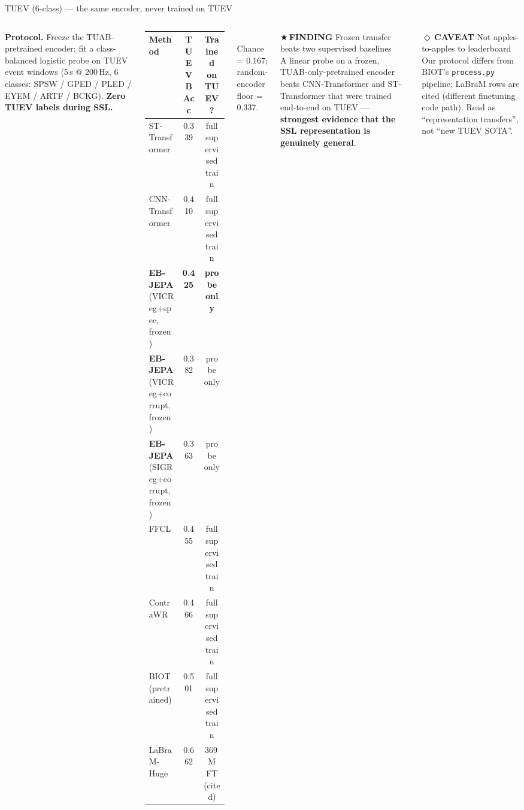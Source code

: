 \documentclass[aspectratio=169,11pt]{beamer}
\newcommand{\caveattag}{\textcolor{tplred}{\scriptsize\sffamily\bfseries$\Diamond$\,CAVEAT}\xspace}
\newcommand{\findingtag}{\textcolor{tplgold}{\scriptsize\sffamily\bfseries$\bigstar$\,FINDING}\xspace}
\newcommand{\sectionheader}[1]{\renewcommand{\insertsection}{#1}}
\begin{document}
\sectionheader{TUEV \,\textperiodcentered\, FROZEN CROSS-TASK TRANSFER}
\begin{frame}{TUEV (6-class) --- the same encoder, never trained on TUEV}
\begin{columns}[T,onlytextwidth]
\textbf{Protocol.} Freeze the TUAB-pretrained encoder; fit a class-balanced
logistic probe on TUEV event windows (5\,s @ 200\,Hz, 6 classes:
SPSW / GPED / PLED / EYEM / ARTF / BCKG).
\textbf{Zero TUEV labels during SSL.}

\vspace{0.3em}
\centering\small
\begin{tabular}{@{}lcc@{}}
\toprule
\textbf{Method} & \textbf{TUEV BAcc} & \textbf{Trained on TUEV?} \\
\midrule
ST-Transformer    & 0.339 & \textcolor{tplred}{full supervised train} \\
CNN-Transformer   & 0.410 & \textcolor{tplred}{full supervised train} \\
\midrule
\textbf{EB-JEPA} (VICReg+spec, frozen) & \textbf{0.425} & \textcolor{tplgreen}{\textbf{probe only}} \\
\textbf{EB-JEPA} (VICReg+corrupt, frozen) & 0.382 & \textcolor{tplgreen}{probe only} \\
\textbf{EB-JEPA} (SIGReg+corrupt, frozen) & 0.363 & \textcolor{tplgreen}{probe only} \\
\midrule
FFCL              & 0.455 & \textcolor{tplred}{full supervised train} \\
ContraWR          & 0.466 & \textcolor{tplred}{full supervised train} \\
BIOT (pretrained) & 0.501 & \textcolor{tplred}{full supervised train} \\
LaBraM-Huge       & 0.662 & \textcolor{tplred}{369\,M FT (cited)} \\
\bottomrule
\end{tabular}\\[0.2em]
{\scriptsize\textcolor{tplsec}{Chance = 0.167; random-encoder floor = 0.337.}}

\begin{findingbox}\findingtag Frozen transfer beats two supervised baselines\\[0.3em]
\small A linear probe on a frozen, TUAB-only-pretrained encoder beats
CNN-Transformer and ST-Transformer that were trained end-to-end on TUEV ---
\textbf{strongest evidence that the SSL representation is genuinely general}.
\end{findingbox}

\vspace{0.4em}
\begin{caveatbox}\caveattag Not apples-to-apples to leaderboard\\[0.3em]
\small Our protocol differs from BIOT's \texttt{process.py} pipeline; LaBraM
rows are cited (different finetuning code path). Read as ``representation
transfers'', not ``new TUEV SOTA''.
\end{caveatbox}
\end{columns}
\end{frame}
\end{document}
